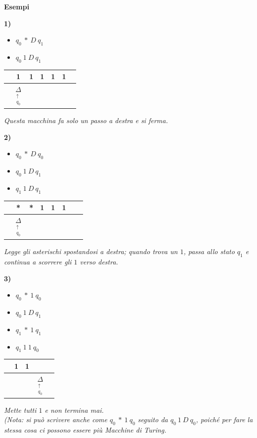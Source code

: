 \newpage
\textbf{Esempi}

\textbf{1)}
\begin{itemize}
    \item[] $q_0 \ * \ D \ q_1$
    \item[] $q_0 \ 1 \ D \ q_1$
\end{itemize}
\begin{center}
\begin{tabular}{|c|c|c|c|c|c|c|}
\hline
& 1 & 1 & 1 & 1 & 1 & \\
\hline
\multicolumn{1}{c}{} & \multicolumn{1}{c}{$\underset{\substack{\uparrow \\ q_0}}{\Delta}$} & \multicolumn{5}{c}{}
\end{tabular}
\end{center}
\textit{Questa macchina fa solo un passo a destra e si ferma.}

\vspace{0.6cm}
\textbf{2)}
\begin{itemize}
    \item[] $q_0 \ * \ D \ q_0$
    \item[] $q_0 \ 1 \ D \ q_1$
    \item[] $q_1 \ 1 \ D \ q_1$
\end{itemize}
\begin{center}
\begin{tabular}{|c|c|c|c|c|c|c|c|}
\hline
& * & * & 1 & 1 & 1 & & \\
\hline
\multicolumn{1}{c}{} & \multicolumn{1}{c}{$\underset{\substack{\uparrow \\ q_0}}{\Delta}$} & \multicolumn{6}{c}{}
\end{tabular}
\end{center}
\textit{Legge gli asterischi spostandosi a destra; quando trova un $1$, passa allo stato $q_1$ e continua a scorrere gli $1$ verso destra.}

\vspace{0.6cm}
\textbf{3)}
\begin{itemize}
    \item[] $q_0 \ * \ 1 \ q_0$
    \item[] $q_0 \ 1 \ D \ q_1$
    \item[] $q_1 \ * \ 1 \ q_1$
    \item[] $q_1 \ 1 \ 1 \ q_0$
\end{itemize}
\begin{center}
\begin{tabular}{|c|c|c|c|c|}
\hline
& 1 & 1 & & \\
\hline
\multicolumn{1}{c}{} & \multicolumn{1}{c}{} & \multicolumn{1}{c}{} & \multicolumn{1}{c}{$\underset{\substack{\uparrow \\ q_0}}{\Delta}$} & \multicolumn{1}{c}{}
\end{tabular}
\end{center}
\textit{Mette tutti $1$ e non termina mai. \\
(Nota: si può scrivere anche come $q_0 \ * \ 1 \ q_0$ seguito da $q_0 \ 1 \ D \ q_0$, poiché per fare la stessa cosa ci possono essere più Macchine di Turing.}

